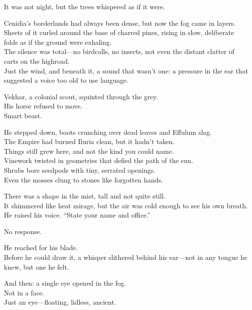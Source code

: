 \documentclass[9pt]{article}
\begin{document}
It was not night, but the trees whispered as if it were.

Cenidia’s borderlands had always been dense, but now the fog came in layers.\\
Sheets of it curled around the base of charred pines, rising in slow, deliberate folds as if the ground were exhaling.\\
The silence was total—no birdcalls, no insects, not even the distant clatter of carts on the highroad.\\
Just the wind, and beneath it, a sound that wasn’t one: a pressure in the ear that suggested a voice too old to use language.

\vspace{1em}

Vekhar, a colonial scout, squinted through the grey.\\
His horse refused to move.\\
Smart beast.

He stepped down, boots crunching over dead leaves and Effulum slag.\\
The Empire had burned Iluria clean, but it hadn’t taken.\\
Things still grew here, and not the kind you could name.\\
Vinework twisted in geometries that defied the path of the sun.\\
Shrubs bore seedpods with tiny, serrated openings.\\
Even the mosses clung to stones like forgotten hands.

\vspace{1em}

There was a shape in the mist, tall and not quite still.\\
It shimmered like heat mirage, but the air was cold enough to see his own breath.\\
He raised his voice. “State your name and office.”

No response.

\vspace{1em}

He reached for his blade.\\
Before he could draw it, a whisper slithered behind his ear—not in any tongue he knew, but one he felt.

\vspace{1em}

And then: a single eye opened in the fog.\\
Not in a face.\\
Just an eye—floating, lidless, ancient.
\end{document}
